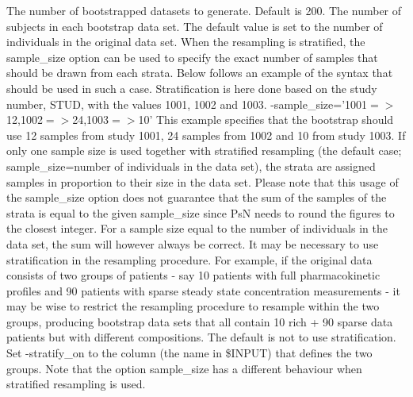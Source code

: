 \begin{optionlist}
The number of bootstrapped datasets to generate. Default is 200. 
\nextopt
{}
The number of subjects in each bootstrap data set. The default       value is set to the number of individuals in the original data set. When the resampling is stratified, the sample\_size option can be used to specify the exact number of samples that should be drawn from each strata. Below follows an example of the syntax that should be used in such a case. Stratification is here done based on the study number, STUD, with the values 1001, 1002 and 1003.  -sample\_size='1001$=>$12,1002$=>$24,1003$=>$10'                          This example specifies that the bootstrap should use 12 samples from study 1001, 24 samples from 1002 and 10 from study 1003. If only one sample size is used together with stratified resampling (the default case; sample\_size=number of individuals in the data set), the strata are assigned samples in proportion to their size in the data set. Please note that this usage of the sample\_size option does not guarantee that the sum of the samples of the strata is equal to the given sample\_size since PsN needs to round the figures to the closest integer. For a sample size equal to the number of individuals in the data set, the sum will however always be correct. 
\nextopt
{}
It may be necessary to use stratification in the resampling procedure. For example, if the original data consists of two groups of patients - say 10 patients with full pharmacokinetic profiles and 90 patients with sparse steady state concentration measurements - it may be wise to restrict the resampling procedure to resample within the two groups, producing bootstrap data sets that all contain 10 rich + 90 sparse data patients but with different compositions. The default is not to use stratification. Set -stratify\_on to the column (the name in \$INPUT) that defines the two groups. Note that the option sample\_size has a different behaviour when stratified resampling is used. 


\end{optionlist}
